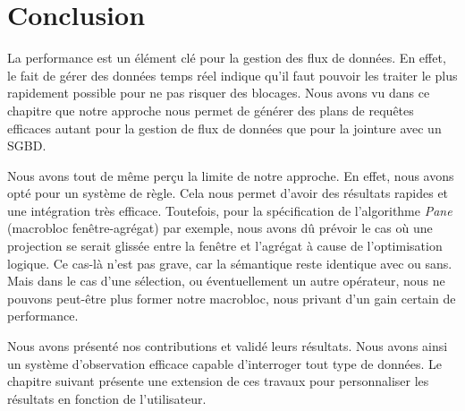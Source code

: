 \section{Conclusion}\label{sec:valid:perfs:conclusion}
La performance est un élément clé pour la gestion des flux de données. En effet, le fait de gérer des données temps réel indique qu'il faut pouvoir les traiter le plus rapidement possible pour ne pas risquer des blocages. Nous avons vu dans ce chapitre que notre approche nous permet de générer des plans de requêtes efficaces autant pour la gestion de flux de données que pour la jointure avec un SGBD.

Nous avons tout de même perçu la limite de notre approche. En effet, nous avons opté pour un système de règle. Cela nous permet d'avoir des résultats rapides et une intégration très efficace. Toutefois, pour la spécification de l'algorithme \textit{Pane} (macrobloc fenêtre-agrégat) par exemple, nous avons dû prévoir le cas où une projection se serait glissée entre la fenêtre et l'agrégat à cause de l'optimisation logique. Ce cas-là n'est pas grave, car la sémantique reste identique avec ou sans. Mais dans le cas d'une sélection, ou éventuellement un autre opérateur, nous ne pouvons peut-être plus former notre macrobloc, nous privant d'un gain certain de performance.

Nous avons présenté nos contributions et validé leurs résultats. Nous avons ainsi un système d'observation efficace capable d'interroger tout type de données. Le chapitre suivant présente une extension de ces travaux pour personnaliser les résultats en fonction de l'utilisateur.